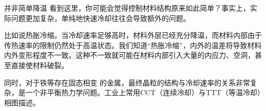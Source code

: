 \begin{example}{并非简单降温}
看到这里，你可能会觉得控制材料结构原来如此简单？事实上，实际问题更加复杂，单纯地快速冷却往往会导致额外的问题。

比如说热胀冷缩。当冷却速率足够高时，材料外层已经充分降温，而材料内部由于传热速率的限制仍然处于高温状态。我们知道“热胀冷缩”，内外的温差将导致材料内外变形程度不一致。这种不一致就可能在材料内部引入大量的内应力、空洞，甚至直接使材料破裂。

同时，对于铁等存在固态相变 的金属，最终晶粒的结构与冷却速率的关系非常复杂，是一个非平衡热力学问题。工业上常用CCT（连续冷却）与TTT（等温冷却）相图描述。
\end{example}
